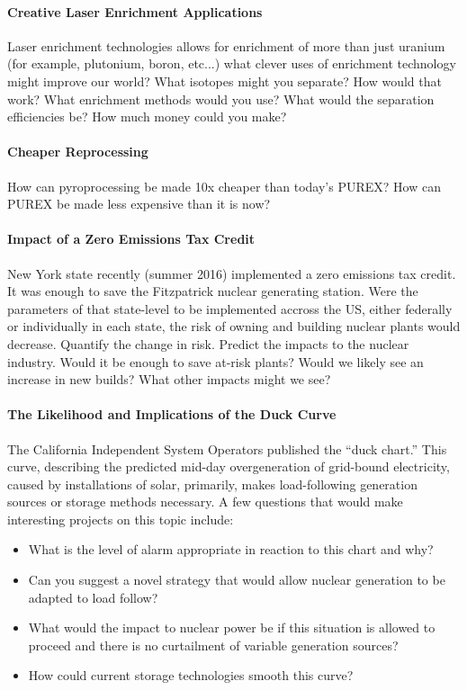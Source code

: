 \documentclass[12pts, answers]{exam}
\begin{document}
\paragraph{Creative Laser Enrichment Applications} Laser enrichment
technologies allows for enrichment of more than just uranium (for example,
plutonium, boron, etc...) what clever uses of enrichment technology might
improve our world? What isotopes might you separate? How would that work? What
enrichment methods would you use? What would the separation efficiencies be?
How much money could you make?

\paragraph{Cheaper Reprocessing} How can pyroprocessing be made 10x cheaper
than today's PUREX? How can PUREX be made less expensive than it is now?

\paragraph{Impact of a Zero Emissions Tax Credit} New York state recently
(summer 2016) implemented a zero emissions tax credit. It was enough to save
the Fitzpatrick nuclear generating station. Were the parameters of that
state-level to be implemented accross the US, either federally or individually
in each state, the risk of owning and building nuclear plants would decrease.
Quantify the change in risk. Predict the impacts to the nuclear industry. Would
it be enough to save at-risk plants? Would we likely see an increase in new
builds? What other impacts might we see?

\paragraph{The Likelihood and Implications of the Duck Curve} The California
Independent System Operators published the ``duck chart.'' This curve,
describing the predicted mid-day overgeneration of grid-bound electricity,
caused by installations of solar, primarily, makes load-following generation
sources or storage methods necessary. A few questions that would make
interesting projects on this topic include:
\begin{itemize}
\item What is the level of alarm appropriate in reaction to this chart and why?
\item Can you suggest a novel strategy that would allow nuclear generation to
be adapted to load follow?
\item What would the impact to nuclear power be if this situation is allowed to
proceed and there is no curtailment of variable generation sources?
\item How could current storage technologies smooth this curve?
\end{itemize}
\end{document}
